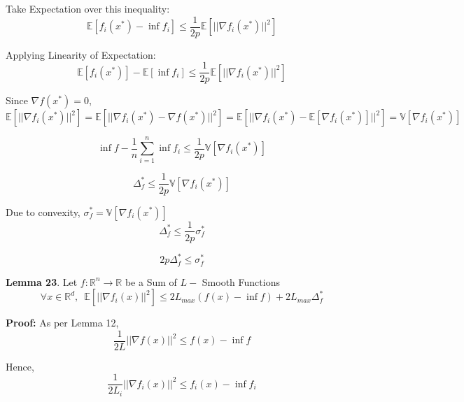 \noindent Take Expectation over this inequality:
\begin{equation}
    \mathbb{E} [f_i(x^*) - \inf f_i] \leq \frac{1}{2p} \mathbb{E} [||\nabla f_i(x^*)||^2]
\end{equation}

\noindent Applying Linearity of Expectation: 
\begin{equation}
    \mathbb{E} [f_i(x^*)] - \mathbb{E} [\inf f_i] \leq \frac{1}{2p} \mathbb{E} [||\nabla f_i(x^*)||^2]
\end{equation}

\noindent Since $\nabla f(x^*) = 0$, $\mathbb{E} [||\nabla f_i(x^*)||^2] = \mathbb{E} [||\nabla f_i(x^*) - \nabla f(x^*)||^2] = \mathbb{E} [||\nabla f_i(x^*) - \mathbb{E}[\nabla f_i(x^*)]||^2] = \mathbb{V} [\nabla f_i(x^*)]$

\begin{equation}
    \inf f - \frac{1}{n} \sum_{i=1}^{n} \inf f_i \leq \frac{1}{2p} \mathbb{V} [\nabla f_i(x^*)]
\end{equation}

\begin{equation}
    \Delta_f^* \leq \frac{1}{2p} \mathbb{V} [\nabla f_i(x^*)]
\end{equation}


Due to convexity, $\sigma_f^* = \mathbb{V} [\nabla f_i(x^*)]$
\begin{equation}
    \Delta_f^* \leq \frac{1}{2p} \sigma_f^*
\end{equation}

\begin{equation}
    2p \Delta_f^* \leq \sigma_f^*
\end{equation}

\noindent \textbf{Lemma 23}.  Let $f: \mathbb{R}^n \rightarrow \mathbb{R}$ be a Sum of $L-$ Smooth Functions
\begin{equation}
    \forall x \in \mathbb{R}^d, \enspace \mathbb{E}[||\nabla f_i(x)||^2] \leq 2L_{max} (f(x) - \inf f) + 2L_{max} \Delta^*_f
\end{equation}

\noindent \textbf{Proof:} 
As per Lemma 12, 
\begin{equation}
    \frac{1}{2L} ||\nabla f(x)||^2 \leq f(x) - \inf f
\end{equation}

\noindent Hence,
\begin{equation}
    \frac{1}{2L_i} ||\nabla f_i(x)||^2 \leq f_i(x) - \inf f_i
\end{equation}


